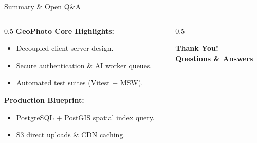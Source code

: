 \documentclass[aspectratio=169]{beamer}
\begin{document}
\begin{frame}{Summary \& Open Q\&A}
  \begin{columns}
    \begin{column}{0.5\textwidth}
      \textbf{GeoPhoto Core Highlights:}
      \begin{itemize}
        \item Decoupled client-server design.
        \item Secure authentication & AI worker queues.
        \item Automated test suites (Vitest + MSW).
      \end{itemize}
      \textbf{Production Blueprint:}
      \begin{itemize}
        \item PostgreSQL + PostGIS spatial index query.
        \item S3 direct uploads & CDN caching.
      \end{itemize}
    \end{column}
    \begin{column}{0.5\textwidth}
      \begin{center}
        \Huge \textbf{Thank You!} \\
        \vspace{1cm}
        \large \textbf{Questions \& Answers}
      \end{center}
    \end{column}
  \end{columns}
\end{frame}
\end{document}
